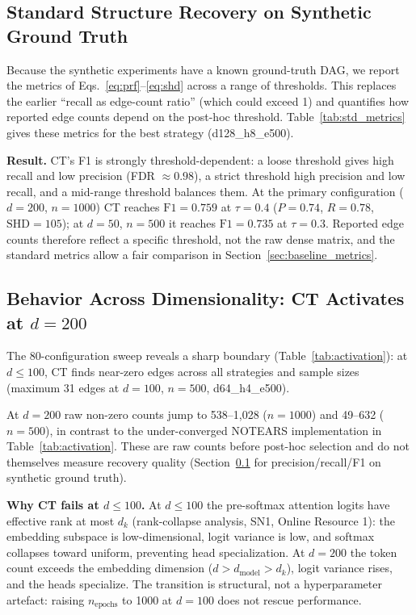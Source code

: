 \documentclass[12pt,a4paper]{article}
\begin{document}
\subsection{Standard Structure Recovery on Synthetic Ground Truth}
\label{sec:std_metrics}

Because the synthetic experiments have a known ground-truth DAG, we report the metrics of Eqs.~\ref{eq:prf}--\ref{eq:shd} across a range of thresholds. This replaces the earlier ``recall as edge-count ratio'' (which could exceed 1) and quantifies how reported edge counts depend on the post-hoc threshold. Table~\ref{tab:std_metrics} gives these metrics for the best strategy (d128\_h8\_e500).

\textbf{Result.} CT's F1 is strongly threshold-dependent: a loose threshold gives high recall and low precision (FDR $\approx 0.98$), a strict threshold high precision and low recall, and a mid-range threshold balances them. At the primary configuration ($d=200$, $n=1000$) CT reaches $\mathrm{F1}=0.759$ at $\tau=0.4$ ($P=0.74$, $R=0.78$, $\mathrm{SHD}=105$); at $d=50$, $n=500$ it reaches $\mathrm{F1}=0.735$ at $\tau=0.3$. Reported edge counts therefore reflect a specific threshold, not the raw dense matrix, and the standard metrics allow a fair comparison in Section~\ref{sec:baseline_metrics}.

\subsection{Behavior Across Dimensionality: CT Activates at \texorpdfstring{$d = 200$}{d = 200}}

The 80-configuration sweep reveals a sharp boundary (Table~\ref{tab:activation}): at $d \le 100$, CT finds near-zero edges across all strategies and sample sizes (maximum 31 edges at $d=100$, $n=500$, d64\_h4\_e500).

At $d=200$ raw non-zero counts jump to 538--1,028 ($n=1000$) and 49--632 ($n=500$), in contrast to the under-converged NOTEARS implementation in Table~\ref{tab:activation}. These are raw counts before post-hoc selection and do not themselves measure recovery quality (Section~\ref{sec:std_metrics} for precision/recall/F1 on synthetic ground truth).

\textbf{Why CT fails at $d \le 100$.} At $d \le 100$ the pre-softmax attention logits have effective rank at most $d_k$ (rank-collapse analysis, SN1, Online Resource 1): the embedding subspace is low-dimensional, logit variance is low, and softmax collapses toward uniform, preventing head specialization. At $d=200$ the token count exceeds the embedding dimension ($d > d_{\text{model}} > d_k$), logit variance rises, and the heads specialize. The transition is structural, not a hyperparameter artefact: raising $n_{\text{epochs}}$ to 1000 at $d=100$ does not rescue performance.
\end{document}
